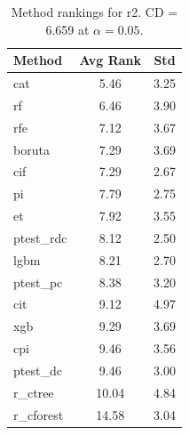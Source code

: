 \begin{table}[h]
\centering
\caption{Method rankings for r2. CD = 6.659 at $\alpha=0.05$.}
\label{tab:ranks_r2}
\begin{tabular}{lcc}
\toprule
Method & Avg Rank & Std \\
\midrule
cat & 5.46 & 3.25 \\
rf & 6.46 & 3.90 \\
rfe & 7.12 & 3.67 \\
boruta & 7.29 & 3.69 \\
cif & 7.29 & 2.67 \\
pi & 7.79 & 2.75 \\
et & 7.92 & 3.55 \\
ptest_rdc & 8.12 & 2.50 \\
lgbm & 8.21 & 2.70 \\
ptest_pc & 8.38 & 3.20 \\
cit & 9.12 & 4.97 \\
xgb & 9.29 & 3.69 \\
cpi & 9.46 & 3.56 \\
ptest_dc & 9.46 & 3.00 \\
r_ctree & 10.04 & 4.84 \\
r_cforest & 14.58 & 3.04 \\
\bottomrule
\end{tabular}
\end{table}